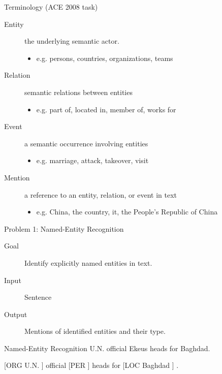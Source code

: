 \documentclass{beamer}
\begin{document}
\begin{frame}{Terminology (ACE 2008 task)}
  \begin{description}
    
  \item[Entity] the underlying semantic actor.
    \begin{itemize}
    \item e.g. persons, countries, organizations, teams
    \end{itemize}
   
  \item[Relation] semantic relations between entities
    \begin{itemize}
    \item e.g. part of, located in, member of, works for
    \end{itemize}

  \item[Event] a semantic occurrence involving entities
    \begin{itemize}
    \item e.g. marriage, attack, takeover, visit
    \end{itemize}

  \item[Mention] a reference to an entity, relation, or event in text
    \begin{itemize}
    \item e.g. China, the country, it, the People's Republic of China
    \end{itemize}
  \end{description}
\end{frame}

\begin{frame}{Problem 1: Named-Entity Recognition}
  \begin{description}
  \item[Goal] Identify explicitly named entities in text.
  \item[Input] Sentence 
  \item[Output] Mentions of identified entities and their type. 
  \end{description}  

\end{frame}

\begin{frame}{Named-Entity Recognition}
  U.N. official Ekeus heads for Baghdad. 
  \air

  [ORG \alert{U.N.} ] official [PER  ] heads for [LOC \alert{Baghdad} ] .  
\end{frame}
\end{document}

